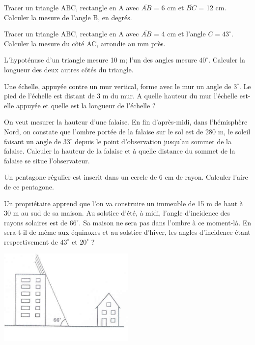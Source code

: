 \begin{exercice}
Tracer un triangle ABC, rectangle en A avec $\overline{AB}$ = 6 cm et $\overline{BC}$ = 12 cm. Calculer la mesure de l’angle B, en degrés. 
\end{exercice}

\begin{exercice}
Tracer un triangle ABC, rectangle en A avec $\overline{AB}$ = 4 cm et l’angle $C = 43^\circ$. Calculer la mesure du côté AC, arrondie au mm près.
\end{exercice}

\begin{exercice}
L’hypoténuse d’un triangle mesure 10 m; l’un des angles mesure $40^\circ$. Calculer la longueur des deux autres côtés du triangle.
\end{exercice}

\begin{exercice}
Une échelle, appuyée contre un mur vertical, forme avec le mur un angle de $3^\circ$. Le pied de l’échelle est distant de 3 m du mur. A quelle hauteur du mur l’échelle est-elle appuyée et quelle est la longueur de l’échelle ?
\end{exercice}

\begin{exercice}
On veut mesurer la hauteur d’une falaise. En fin d’après-midi, dans l’hémisphère Nord, on constate que l’ombre portée de la falaise sur le sol est de 280 m, le soleil faisant un angle de $33^\circ$ depuis le point d’observation jusqu’au sommet de la falaise. Calculer la hauteur de la falaise et à quelle distance du sommet de la falaise se situe l’observateur.
\end{exercice}

\begin{exercice}
Un pentagone régulier est inscrit dans un cercle de 6 cm de rayon. Calculer l’aire de ce pentagone.
\end{exercice}

\begin{exercice}
Un propriétaire apprend que l’on va construire un immeuble de 15 m de haut à 30 m au sud de sa maison. Au solstice d’été, à midi, l’angle d’incidence des rayons solaires est de $66^\circ$. Sa maison ne sera pas dans l’ombre à ce moment-là. En sera-t-il de même aux équinoxes et au solstice d’hiver, les angles d’incidence étant respectivement de $43^\circ$ et $20^\circ$ ?
\begin{center}
\includegraphics[width = 0.5\textwidth]{trigo/image/trigo11.png}
\end{center}
\end{exercice}


